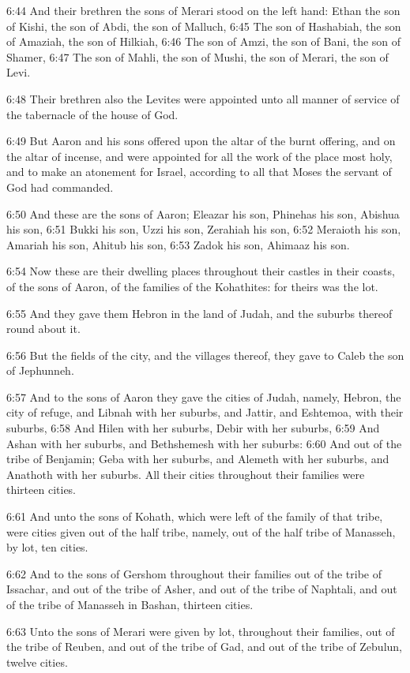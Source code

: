6:44 And their brethren the sons of Merari stood on the left hand:
Ethan the son of Kishi, the son of Abdi, the son of Malluch, 6:45 The
son of Hashabiah, the son of Amaziah, the son of Hilkiah, 6:46 The son
of Amzi, the son of Bani, the son of Shamer, 6:47 The son of Mahli,
the son of Mushi, the son of Merari, the son of Levi.

6:48 Their brethren also the Levites were appointed unto all manner of
service of the tabernacle of the house of God.

6:49 But Aaron and his sons offered upon the altar of the burnt
offering, and on the altar of incense, and were appointed for all the
work of the place most holy, and to make an atonement for Israel,
according to all that Moses the servant of God had commanded.

6:50 And these are the sons of Aaron; Eleazar his son, Phinehas his
son, Abishua his son, 6:51 Bukki his son, Uzzi his son, Zerahiah his
son, 6:52 Meraioth his son, Amariah his son, Ahitub his son, 6:53
Zadok his son, Ahimaaz his son.

6:54 Now these are their dwelling places throughout their castles in
their coasts, of the sons of Aaron, of the families of the Kohathites:
for theirs was the lot.

6:55 And they gave them Hebron in the land of Judah, and the suburbs
thereof round about it.

6:56 But the fields of the city, and the villages thereof, they gave
to Caleb the son of Jephunneh.

6:57 And to the sons of Aaron they gave the cities of Judah, namely,
Hebron, the city of refuge, and Libnah with her suburbs, and Jattir,
and Eshtemoa, with their suburbs, 6:58 And Hilen with her suburbs,
Debir with her suburbs, 6:59 And Ashan with her suburbs, and
Bethshemesh with her suburbs: 6:60 And out of the tribe of Benjamin;
Geba with her suburbs, and Alemeth with her suburbs, and Anathoth with
her suburbs. All their cities throughout their families were thirteen
cities.

6:61 And unto the sons of Kohath, which were left of the family of
that tribe, were cities given out of the half tribe, namely, out of
the half tribe of Manasseh, by lot, ten cities.

6:62 And to the sons of Gershom throughout their families out of the
tribe of Issachar, and out of the tribe of Asher, and out of the tribe
of Naphtali, and out of the tribe of Manasseh in Bashan, thirteen
cities.

6:63 Unto the sons of Merari were given by lot, throughout their
families, out of the tribe of Reuben, and out of the tribe of Gad, and
out of the tribe of Zebulun, twelve cities.

